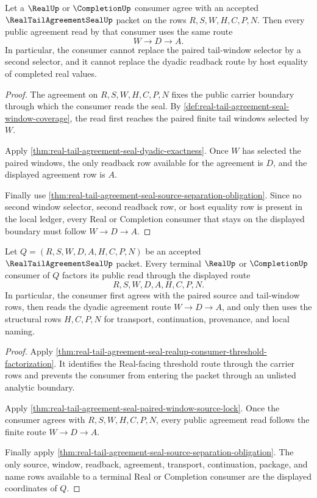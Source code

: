 \begin{theorem}
\label{thm:real-tail-agreement-seal-paired-window-source-lock}
Let a $\RealUp$ or $\CompletionUp$ consumer agree with an accepted $\RealTailAgreementSealUp$ packet on the rows $R,S,W,H,C,P,N$. Then every public agreement read by that consumer uses the same route
$$
W \to D \to A.
$$
In particular, the consumer cannot replace the paired tail-window selector by a second selector, and it cannot replace the dyadic readback route by host equality of completed real values.
\end{theorem}
\begin{proof}
The agreement on $R,S,W,H,C,P,N$ fixes the public carrier boundary through which the consumer reads the seal. By \autoref{def:real-tail-agreement-seal-window-coverage}, the read first reaches the paired finite tail windows selected by $W$.

Apply \autoref{thm:real-tail-agreement-seal-dyadic-exactness}. Once $W$ has selected the paired windows, the only readback row available for the agreement is $D$, and the displayed agreement row is $A$.

Finally use \autoref{thm:real-tail-agreement-seal-source-separation-obligation}. Since no second window selector, second readback row, or host equality row is present in the local ledger, every Real or Completion consumer that stays on the displayed boundary must follow $W \to D \to A$.
\end{proof}

\begin{theorem}
\label{thm:real-tail-agreement-seal-terminal-consumer-factorization}
Let $Q=(R,S,W,D,A,H,C,P,N)$ be an accepted $\RealTailAgreementSealUp$ packet. Every terminal $\RealUp$ or $\CompletionUp$ consumer of $Q$ factors its public read through the displayed route
$$
R,S,W,D,A,H,C,P,N.
$$
In particular, the consumer first agrees with the paired source and tail-window rows, then reads the dyadic agreement route $W \to D \to A$, and only then uses the structural rows $H,C,P,N$ for transport, continuation, provenance, and local naming.
\end{theorem}
\begin{proof}
Apply \autoref{thm:real-tail-agreement-seal-realup-consumer-threshold-factorization}. It identifies the Real-facing threshold route through the carrier rows and prevents the consumer from entering the packet through an unlisted analytic boundary.

Apply \autoref{thm:real-tail-agreement-seal-paired-window-source-lock}. Once the consumer agrees with $R,S,W,H,C,P,N$, every public agreement read follows the finite route $W \to D \to A$.

Finally apply \autoref{thm:real-tail-agreement-seal-source-separation-obligation}. The only source, window, readback, agreement, transport, continuation, package, and name rows available to a terminal Real or Completion consumer are the displayed coordinates of $Q$.
\end{proof}

